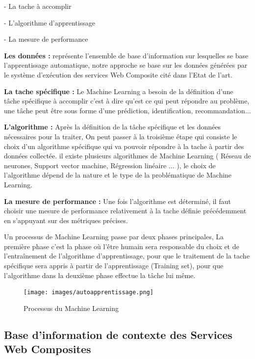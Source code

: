 - La tache à accomplir 

- L'algorithme d'apprentissage

- La mesure de performance


\textbf{Les données : } représente l'ensemble de base d'information sur lesquelles se base l'apprentissage automatique, notre approche se base sur les données générées par le système d'exécution des services Web Composite cité dans l'Etat de l'art.

\textbf{La tache spécifique : } Le Machine Learning a besoin de la définition d'une tâche spécifique à accomplir c'est à dire  qu'est ce qui peut répondre au problème, une tâche peut être sous forme d'une prédiction, identification, recommandation... 

\textbf{L'algorithme :} Après la définition de la tâche spécifique et les données nécessaires pour la traiter, On peut passer à la troisième étape qui consiste le choix d'un algorithme spécifique qui va pouvoir répondre à la tache à partir des données collectée. il existe plusieurs algorithmes de Machine Learning ( Réseau de neurones, Support vector machine, Régression linéaire ... ), le choix de l'algorithme dépend de la nature et le type de la problématique de Machine Learning.

\textbf{La mesure de performance :} Une fois l'algorithme est déterminé, il faut choisir une mesure de performance relativement à la tache définie précédemment en s'appuyant sur des métriques précises.  

Un processus de Machine Learning passe par deux phases principales, La première phase c'est la phase où l'être humain sera responsable du choix et de l'entraînement de l'algorithme d'apprentissage, pour que le traitement de la tache spécifique sera appris à partir de l'apprentissage (Training set), pour que l'algorithme dans la deuxième phase effectue la tâche lui même.

\begin{figure}[H]
\begin{center}
\texttt{[image: images/autoapprentissage.png]}
\end{center}
\caption{Processus du Machine Learning}
\label{fig:6}
\end{figure}


\subsection{Base d'information de contexte des Services Web Composites}

